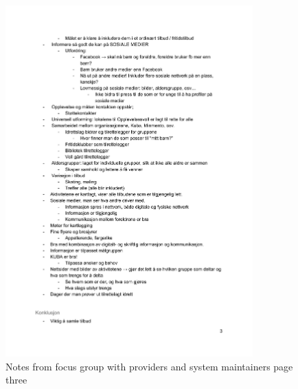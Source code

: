 \begin{figure}[H]
\centering
    \includegraphics[width=0.85\textwidth]{fig/workshop/providers/WSTilbydere_3.pdf}
    \caption{Notes from focus group with providers and system maintainers page three}
    \label{Provider_3}
\end{figure}

